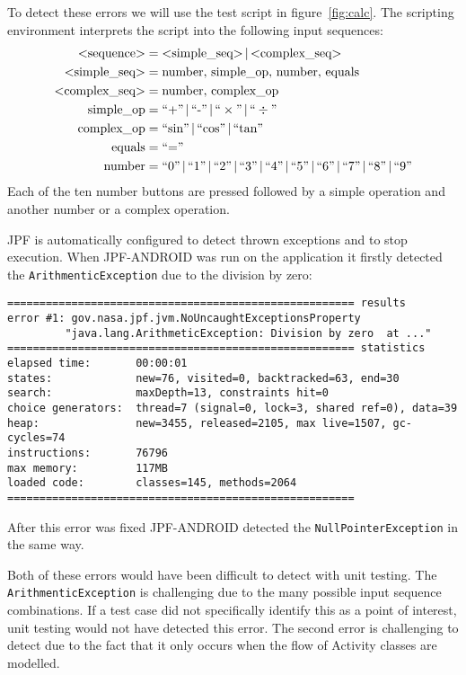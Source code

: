 \documentclass{acm_proc_article-sp}
\begin{document}
To detect these errors we will use the test script in figure~\ref{fig:calc}. The scripting environment interprets the script into the
following input sequences:
\begin{align*}
\text{<sequence>} &= \text{<simple\_seq>}\,|\,\text{<complex\_seq>}\\
\text{<simple\_seq>} &= \text{number},\,\text{simple\_op},\,\text{number},\,\text{equals}\\
\text{<complex\_seq>} &= \text{number},\,\text{complex\_op}\\
\text{simple\_op} &= \text{``+''}\,|\,\text{``-''}\,|\,\text{``}\times\text{''}\,|\,\text{``}\div\text{''}\\
\text{complex\_op} &= \text{``sin''}\,|\,\text{``cos''}\,|\,\text{``tan''}\\
\text{equals} &= \text{``=''} \\
\text{number} &= \text{``0''\,|\,``1''\,|\,``2''\,|\,``3''\,|\,``4''\,|\,``5''\,|\,``6''\,|\,``7''\,|\,``8''\,|\,``9''}
\end{align*}
Each of the ten number buttons are pressed followed by a simple operation and another number or a complex operation.

JPF is automatically configured to detect thrown exceptions and to stop execution. When JPF-ANDROID was run on the application it firstly
detected the \texttt{ArithmenticException} due to the division by zero:
\begingroup
 \fontsize{6pt}{7pt}\selectfont
\begin{verbatim}
====================================================== results
error #1: gov.nasa.jpf.jvm.NoUncaughtExceptionsProperty 
         "java.lang.ArithmeticException: Division by zero  at ..."
====================================================== statistics
elapsed time:       00:00:01
states:             new=76, visited=0, backtracked=63, end=30
search:             maxDepth=13, constraints hit=0
choice generators:  thread=7 (signal=0, lock=3, shared ref=0), data=39
heap:               new=3455, released=2105, max live=1507, gc-cycles=74
instructions:       76796
max memory:         117MB
loaded code:        classes=145, methods=2064
======================================================
\end{verbatim}
\endgroup
After this error was fixed JPF-ANDROID detected the \texttt{NullPointerException} in the same way.

Both of these errors would have been difficult to detect with unit testing. The \texttt{ArithmenticException} is challenging due
to the many possible input sequence combinations. If a test case did not specifically identify this as a point of interest, unit testing
would not have detected this error. The second error is challenging to detect due to the fact that it only occurs when the flow of Activity
classes are modelled.
\end{document}
